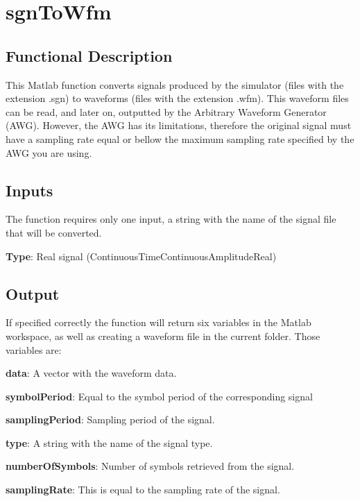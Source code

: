 \clearpage

\section{sgnToWfm}


\subsection*{Functional Description}

This Matlab function converts signals produced by the simulator (files with the extension .sgn) to waveforms  (files with the extension .wfm). This waveform files can be read, and later on, outputted by the Arbitrary Waveform Generator (AWG).
However, the AWG has its limitations, therefore the original signal must have a sampling rate equal or bellow the maximum sampling rate specified by the AWG you are using.

\subsection*{Inputs}

The function requires only one input, a string with the name of the signal file that will be converted. 


\textbf{Type}: Real signal (ContinuousTimeContinuousAmplitudeReal)

\subsection*{Output}

If specified correctly the function will return six variables in the Matlab workspace, as well as creating a waveform file in the current folder.
Those variables are:

\bigskip

\textbf{data}: A vector with the waveform data.
\bigskip

\textbf{symbolPeriod}: Equal to the symbol period of the corresponding signal 
\bigskip

\textbf{samplingPeriod}: Sampling period of the signal.
\bigskip

\textbf{type}: A string with the name of the signal type. 
\bigskip

\textbf{numberOfSymbols}: Number of symbols retrieved from the signal.
\bigskip

\textbf{samplingRate}: This is equal to the sampling rate of the signal.
\bigskip

